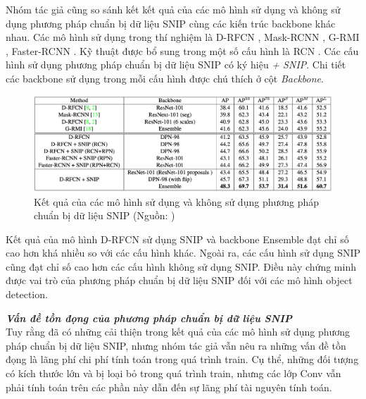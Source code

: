 {    \noindent
    Nhóm tác giả cũng so sánh kết kết quả của các mô hình sử dụng và không sử dụng phương pháp chuẩn bị dữ liệu SNIP cùng các kiến trúc backbone khác nhau.
    Các mô hình sử dụng trong thí nghiệm là D-RFCN \cite{}, Mask-RCNN \cite{}, G-RMI \cite{}, Faster-RCNN \cite{}.
    Kỹ thuật được bổ sung trong một số cấu hình là RCN \cite{}.
    Các cấu hình sử dụng phương pháp chuẩn bị dữ liệu SNIP có ký hiệu \textit{+ SNIP}.
    Chi tiết các backbone sử dụng trong mỗi cấu hình được chú thích ở cột \textit{Backbone}.
    
    \begin{figure}[H]
        \centering
        \includegraphics[width=16cm] {images/snip_results_2}
        \caption{Kết quả của các mô hình sử dụng và không sử dụng phương pháp chuẩn bị dữ liệu SNIP (Nguồn: \cite{singh2018analysis})}
        \label{fig:snip_results_2}
    \end{figure}

    \noindent
    Kết quả của mô hình D-RFCN sử dụng SNIP và backbone Ensemble đạt chỉ số cao hơn khá nhiều so với các cấu hình khác.
    Ngoài ra, các cấu hình sử dụng SNIP cũng đạt chỉ số cao hơn các cấu hình không sử dụng SNIP.
    Điều này chứng minh được vai trò của phương pháp chuẩn bị dữ liệu SNIP đối với các mô hình object detection.

    \noindent
    \textbf{\textit{Vấn đề tồn đọng của phương pháp chuẩn bị dữ liệu SNIP}} \\
    Tuy rằng đã có những cải thiện trong kết quả của các mô hình sử dụng phương pháp chuẩn bị dữ liệu SNIP, nhưng nhóm tác giả vẫn nêu ra những vấn đề tồn đọng là lãng phí chi phí tính toán trong quá trình train.
    Cụ thể, những đối tượng có kích thước lớn và bị loại bỏ trong quá trình train, nhưng các lớp Conv  vẫn phải tính toán trên các phần này dẫn đến sự lãng phí tài nguyên tính toán.
}
